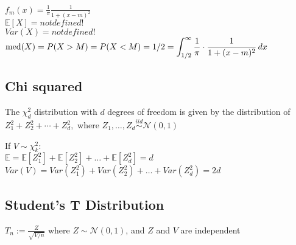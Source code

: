 $f_ m(x) = \frac{1}{\pi } \frac{1}{1 + (x - m)^2}$\\

$\mathbb{E}[X]=not defined!$\\
$Var(X)=not defined!$\\

$\text {med}(X) = P(X > M) = P(X < M)\\ = 1/2 = \displaystyle \int _{1/2}^{\infty } \frac{1}{\pi } \cdot \frac{1}{1 + (x-m)^2} \,  dx$

\subsection*{Chi squared}
The $\chi _ d^2$ distribution with $d$ degrees of freedom is given by the distribution of $Z_1^2 + Z_2^2 + \cdots + Z_ d^2,$ where $Z_1, \ldots , Z_ d \stackrel{iid}{\sim } \mathcal{N}(0,1)$

If $V \sim \chi^2_k:$\\

$\mathbb{E}= \mathbb{E}[Z_1^2] + \mathbb{E}[Z_2^2] + \ldots + \mathbb{E}[Z_d^2] = d$\\ 

$Var(V) = Var(Z_1^2) + Var(Z_2^2) + \ldots + Var(Z_d^2) = 2d$

\subsection*{Student's T Distribution}

$T_ n := \frac{Z}{\sqrt{V/n}}$ where $Z \sim \mathcal{N}(0,1)$, and $Z$ and $V$ are independent